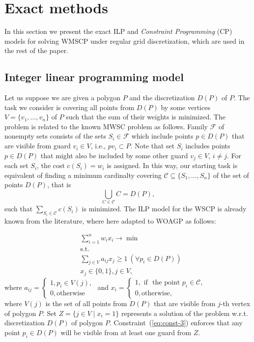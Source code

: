 \documentclass[runningheads,a4paper]{elsarticle}
\begin{document}
	\section{Exact methods}
	In this section we present the exact ILP and \emph{Constraint Programming} (CP) models for solving WMSCP  under regular grid discretization, which are used  in the rest of the paper.
	\subsection{Integer linear programming model}
	Let us suppose we are given a polygon $P$ and the discretization $D(P)$ of $P$.  The task we consider is covering all points from $D(P)$ by some vertices $V=\{v_1,...,v_n\}$ of $P$ such that the sum of their weights is minimized.
	The problem is related to the known MWSC problem as follows.
	Family $\mathcal{F}$ of nonempty sets consists of the sets
	$S_i \in \mathcal{F}$ which include points $p \in D(P)$ that are visible from guard $v_i\in V$, i.e., $pv_i \subset P$.  Note that set $S_i$ includes points $p\in D(P)$ that might also be included by some other guard $v_j\in V$, $i \neq j$. For each set $S_i$, the cost $c(S_i) = w_i$ is assigned.  In this way, our starting task is equivalent of finding a minimum cardinalty covering $\mathcal{C}\subseteq\{S_1,...,S_n\}$ of the set of points $D(P)$, that is
	$$ \bigcup_{C \in \mathcal{C}} C = D(P),$$ such that $\sum_{S_i \in \mathcal{C}} c(S_i)$ is minimized.  The ILP  model for the WSCP is already known from the literature, where  here adapted to WOAGP  as follows:

	\begin{align}
	&\sum_{i=1}^n w_ix_i \longrightarrow \min  \label{eq:woagp-min}\\
	&\mbox{s.t.} \\
	&\sum_{j\in V} a_{ij}x_j \geq 1\ (\forall p_i\in D(P)) \label{eq:const-3}\\
	& x_j \in \{0,1\}, j \in V,
	\end{align}
	where
	$a_{ij} = \begin{cases}
	1, p_i \in V(j), \\
	0, \mbox{otherwise}
	\end{cases}$
	and $x_i = \begin{cases}
	1, \mbox{ if } \mbox{ the point } p_i \in \mathcal{C},\\
	0, \mbox{otherwise},
	\end{cases}$ \\

	where $V(j)$ is the set of all points from $D(P)$ that are visible from $j$-th vertex of polygon $P$.
	Set $Z = \{j \in V\mid x_i=1\}$ represents a solution of the problem w.r.t. discretization $D(P)$ of polygon $P$.
	Constraint~(\ref{eq:const-3}) enforces that any point $p_i \in D(P)$ will be visible from at least one guard from $Z$.
	
\end{document}

